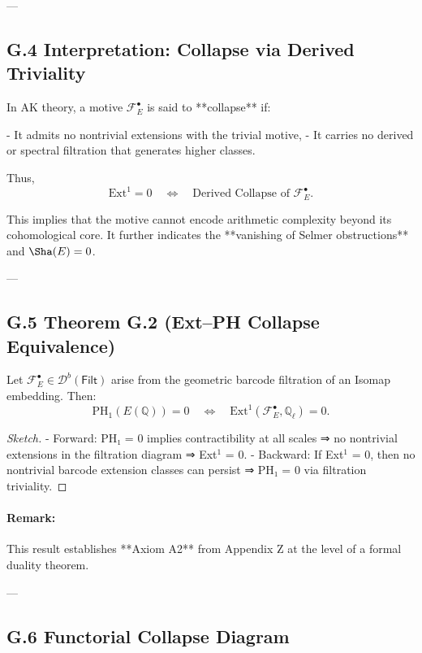 ---

\subsection*{G.4 Interpretation: Collapse via Derived Triviality}

In AK theory, a motive \( \mathcal{F}_E^\bullet \) is said to **collapse** if:

- It admits no nontrivial extensions with the trivial motive,
- It carries no derived or spectral filtration that generates higher classes.

Thus,
\[
\mathrm{Ext}^1 = 0 \quad \Longleftrightarrow \quad \text{Derived Collapse of } \mathcal{F}_E^\bullet.
\]

This implies that the motive cannot encode arithmetic complexity beyond its cohomological core.  
It further indicates the **vanishing of Selmer obstructions** and \( \Sha(E) = 0 \).

---

\subsection*{G.5 Theorem G.2 (Ext–PH Collapse Equivalence)}

\begin{theorem}
Let \( \mathcal{F}_E^\bullet \in \mathcal{D}^b(\mathsf{Filt}) \) arise from the geometric barcode filtration of an Isomap embedding. Then:
\[
\mathrm{PH}_1(E(\mathbb{Q})) = 0 \quad \Longleftrightarrow \quad \mathrm{Ext}^1(\mathcal{F}_E^\bullet, \mathbb{Q}_\ell) = 0.
\]
\end{theorem}

\begin{proof}[Sketch]
- Forward: PH₁ = 0 implies contractibility at all scales ⇒ no nontrivial extensions in the filtration diagram ⇒ Ext$^1$ = 0.
- Backward: If Ext$^1$ = 0, then no nontrivial barcode extension classes can persist ⇒ PH₁ = 0 via filtration triviality.
\end{proof}

\paragraph{Remark:}  
This result establishes **Axiom A2** from Appendix Z at the level of a formal duality theorem.

---

\subsection*{G.6 Functorial Collapse Diagram}


